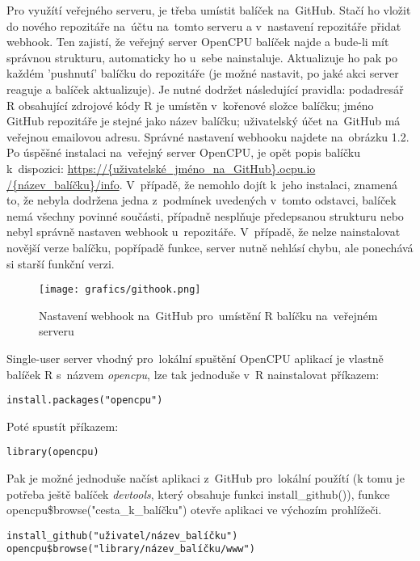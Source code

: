 \documentclass[thesis=B,czech]{FITthesis}[2012/06/26]
\begin{document}
\begin{sloppypar}
Pro využítí veřejného serveru, je třeba umístit balíček na~GitHub. Stačí ho vložit do nového repozitáře na~účtu na~tomto serveru a v~nastavení repozitáře přidat webhook. Ten zajistí, že veřejný server OpenCPU balíček najde a bude-li mít správnou strukturu, automaticky ho u~sebe nainstaluje. Aktualizuje ho pak po každém 'pushnutí' balíčku do repozitáře (je možné nastavit, po jaké akci server reaguje a balíček aktualizuje). Je nutné dodržet následující pravidla: podadresář R obsahující zdrojové kódy R je umístěn v~kořenové složce balíčku; jméno GitHub repozitáře je stejné jako název balíčku; uživatelský účet na~GitHub má veřejnou emailovou adresu. Správné nastavení webhooku najdete na~obrázku 1.2. Po úspěšné instalaci na~veřejný server OpenCPU, je opět popis balíčku k~dispozici: \url{https://{uživatelské_jméno_na_GitHub}.ocpu.io
/{název_balíčku}/info}. 
V~případě, že nemohlo dojít k~jeho instalaci, znamená to, že nebyla dodržena jedna z~podmínek uvedených v~tomto odstavci, balíček nemá všechny povinné součásti, případně nesplňuje předepsanou strukturu nebo nebyl správně nastaven webhook u~repozitáře. V~případě, že nelze nainstalovat novější verze balíčku, popřípadě funkce, server nutně nehlásí chybu, ale ponechává si starší funkční verzi.
\end{sloppypar}

\begin{figure}[ht]
    \centering
    \texttt{[image: grafics/githook.png]}
    \caption{Nastavení webhook na~GitHub pro~umístění R balíčku na~veřejném serveru \cite{OpenCPUwebhook}}
\end{figure}

Single-user server vhodný pro~lokální spuštění OpenCPU aplikací je vlastně balíček R s~názvem \textit{opencpu}, lze tak jednoduše v~R nainstalovat příkazem:
\begin{verbatim}
install.packages("opencpu")
\end{verbatim}
Poté spustít příkazem:
\begin{verbatim}
library(opencpu)
\end{verbatim}
Pak je možné jednoduše načíst aplikaci z~GitHub pro~lokální použítí (k tomu je potřeba ještě balíček \textit{devtools}, který obsahuje funkci install\_github()), funkce opencpu\$browse("cesta\_k\_balíčku") otevře aplikaci ve výchozím prohlížeči.

\begin{alltt}
install_github("{uživatel}/{název_balíčku}")
opencpu\$browse("library/{název_balíčku}/www") 
\end{alltt}
\end{document}
